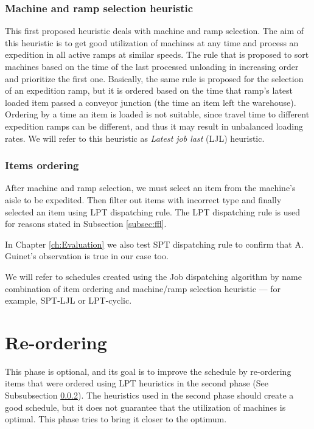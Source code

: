 \documentclass{ctuthesis}
\begin{document}
\subsubsection{Machine and ramp selection heuristic }

This first proposed heuristic deals with machine and ramp selection.
The aim of this heuristic is to get good utilization of machines at any time and process an expedition in all active ramps at similar speeds. The rule that is proposed to sort machines based on the time of the last processed unloading in increasing order and prioritize the first one. 
Basically, the same rule is proposed for the selection of an expedition ramp, but it is ordered based on the time that ramp's latest loaded item passed a conveyor junction (the time an item left the warehouse). Ordering by a time an item is loaded is not suitable, since travel time to different expedition ramps can be different, and thus it may result in unbalanced loading rates. We will refer to this heuristic as \emph{Latest job last} (LJL) heuristic.

\subsubsection{Items ordering}
\label{subsubsec:itemsordering}

After machine and ramp selection, we must select an item from the machine's aisle to be expedited. Then filter out items with incorrect type and finally selected an item using LPT dispatching rule. The LPT dispatching rule is used for reasons stated in Subsection \ref{subsec:ffl}.

In Chapter \ref{ch:Evaluation} we also test SPT dispatching rule to confirm that A. Guinet's observation is true in our case too. 

We will refer to schedules created using the Job dispatching algorithm by name combination of item ordering and machine/ramp selection heuristic — for example, SPT-LJL or LPT-cyclic.

\section{Re-ordering}
\label{sec:reordering}
This phase is optional, and its goal is to improve the schedule by re-ordering items that were ordered using LPT heuristics in the second phase (See Subsubsection \ref{subsubsec:itemsordering}). The heuristics used in the second phase should create a good schedule, but it does not guarantee that the utilization of machines is optimal. This phase tries to bring it closer to the optimum.
\end{document}
